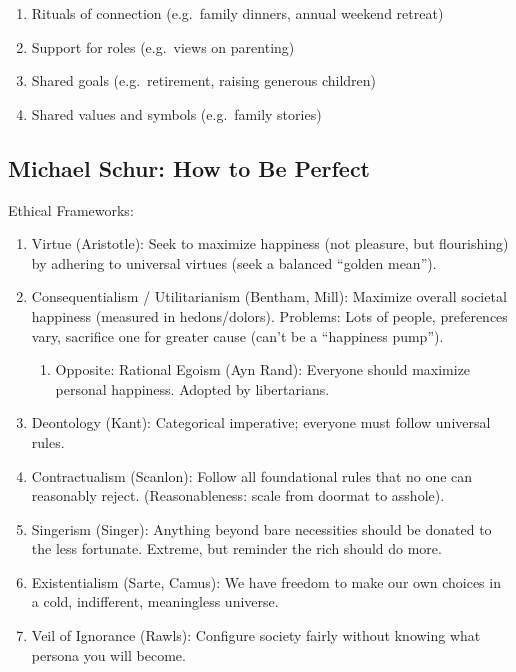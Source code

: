 \documentclass[
]{article}
\providecommand{\tightlist}{%
  \setlength{\itemsep}{0pt}\setlength{\parskip}{0pt}}
\begin{document}
\begin{enumerate}
  \begin{enumerate}
  \def\labelenumii{\arabic{enumii}.}
  \setcounter{enumii}{4}
  \item
    Rituals of connection (e.g.~family dinners, annual weekend retreat)
  \item
    Support for roles (e.g.~views on parenting)
  \item
    Shared goals (e.g.~retirement, raising generous children)
  \item
    Shared values and symbols (e.g.~family stories)
  \end{enumerate}
\end{enumerate}

\hypertarget{michael-schur-how-to-be-perfect}{%
\subsection{Michael Schur: How to Be
Perfect}\label{michael-schur-how-to-be-perfect}}

Ethical Frameworks:

\begin{enumerate}
\def\labelenumi{\arabic{enumi}.}
\item
  Virtue (Aristotle): Seek to maximize happiness (not pleasure, but
  flourishing) by adhering to universal virtues (seek a balanced
  ``golden mean'').
\item
  Consequentialism / Utilitarianism (Bentham, Mill): Maximize overall
  societal happiness (measured in hedons/dolors). Problems: Lots of
  people, preferences vary, sacrifice one for greater cause (can't be a
  ``happiness pump'').

  \begin{enumerate}
  \def\labelenumii{\arabic{enumii}.}
  \tightlist
  \item
    Opposite: Rational Egoism (Ayn Rand): Everyone should maximize
    personal happiness. Adopted by libertarians.
  \end{enumerate}
\item
  Deontology (Kant): Categorical imperative; everyone must follow
  universal rules.
\item
  Contractualism (Scanlon): Follow all foundational rules that no one
  can reasonably reject. (Reasonableness: scale from doormat to
  asshole).
\item
  Singerism (Singer): Anything beyond bare necessities should be donated
  to the less fortunate. Extreme, but reminder the rich should do more.
\item
  Existentialism (Sarte, Camus): We have freedom to make our own choices
  in a cold, indifferent, meaningless universe.
\item
  Veil of Ignorance (Rawls): Configure society fairly without knowing
  what persona you will become.
\end{enumerate}
\end{document}

